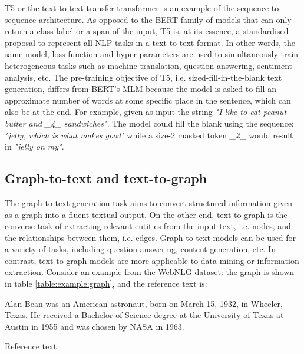 T5 or the text-to-text transfer transformer\cite{T5} is an example of the sequence-to-sequence architecture. As opposed to the BERT-family of models that can only return a class label or a span of the input,  T5 is, at its essence, a standardised proposal to represent all NLP tasks in a text-to-text format. In other words, the same model, loss function and hyper-parameters are used to simultaneously train heterogeneous tasks such as machine translation, question answering, sentiment analysis, etc. The pre-training objective of T5, i.e. sized-fill-in-the-blank text generation, differs from BERT's MLM because the model is asked to fill an approximate number of words at some specific place in the sentence, which can also be at the end. For example, given as input the string \textit{"I like to eat peanut butter and \_4\_ sandwiches"}\cite{googleBlogT5}. The model could fill the blank using the sequence: \textit{"jelly, which is what makes good"} while a size-2 masked token \textit{\_2\_} would result in \textit{"jelly on my"}.





\subsection{Graph-to-text and text-to-graph} \label{background:G2T}



The graph-to-text generation task aims to convert structured information given as a graph into a fluent textual output. On the other end, text-to-graph is the converse task of extracting relevant entities from the input text, i.e. nodes, and the relationships between them, i.e. edges. Graph-to-text models can be used for a variety of tasks, including question-answering, content generation, etc. In contrast, text-to-graph models are more applicable to data-mining or information extraction.
Consider an example from the WebNLG dataset: the graph is shown in table \ref{table:example:graph}, and the reference text is:

\epigraph{
Alan Bean was an American astronaut, born on March 15, 1932, in Wheeler, Texas. He received a Bachelor of Science degree at the University of Texas at Austin in 1955 and was chosen by NASA in 1963.
}{Reference text}

